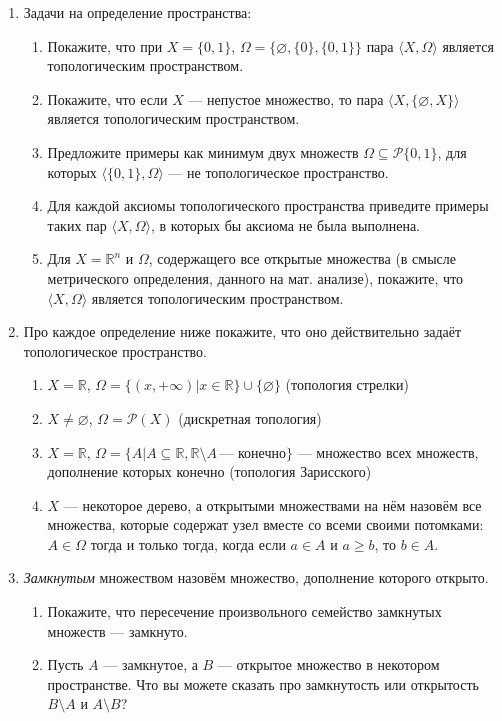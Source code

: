 \documentclass[10pt,a4paper,oneside]{article}
\begin{document}
\begin{enumerate}
\item Задачи на определение пространства:
\begin{enumerate}
\item Покажите, что при $X = \{0,1\}$, $\Omega = \{\varnothing, \{0\}, \{0,1\}\}$ пара $\langle X, \Omega \rangle$
является топологическим пространством.
\item Покажите, что если $X$ --- непустое множество, то пара $\langle X, \{ \varnothing, X \}\rangle$ является
топологическим пространством.
\item Предложите примеры как минимум двух множеств $\Omega \subseteq \mathcal{P}\{0,1\}$, для которых
$\langle \{0,1\}, \Omega\rangle$ --- не топологическое пространство.
\item Для каждой аксиомы топологического пространства приведите примеры таких пар 
$\langle X, \Omega\rangle$, в которых бы аксиома не была выполнена.
\item Для $X = \mathbb{R}^n$ и $\Omega$, содержащего все открытые множества (в смысле метрического
определения, данного на мат. анализе), покажите, что $\langle X, \Omega \rangle$ является 
топологическим пространством.
\end{enumerate}

\item Про каждое определение ниже покажите, что оно действительно задаёт топологическое пространство.
\begin{enumerate}
\item $X = \mathbb{R}$, $\Omega = \{(x,+\infty) | x \in \mathbb{R}\} \cup \{\varnothing\}$ (топология стрелки)
\item $X \ne \varnothing$, $\Omega = \mathcal{P}(X)$ (дискретная топология)
\item $X = \mathbb{R}$, $\Omega = \{ A | A \subseteq\mathbb{R}, \mathbb{R}\setminus A\,\textrm{--- конечно}\}$
--- множество всех множеств, дополнение которых конечно (топология Зарисского)
\item $X$ --- некоторое дерево, а открытыми множествами на нём назовём все множества, которые
содержат узел вместе со всеми своими потомками:
$A \in \Omega$ тогда и только тогда, когда если $a \in A$ и $a \ge b$, то $b \in A$.
\end{enumerate}

\item \emph{Замкнутым} множеством назовём множество, дополнение которого открыто. 
\begin{enumerate}
\item Покажите, что пересечение произвольного семейство замкнутых множеств --- замкнуто.
\item Пусть $A$ --- замкнутое, а $B$ --- открытое множество в некотором пространстве.
Что вы можете сказать про замкнутость или открытость $B\setminus A$ и $A \setminus B$?
\end{enumerate}


\end{enumerate}
\end{document}
